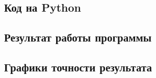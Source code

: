 \documentclass[a4paper,12pt]{article}
\newenvironment{longlisting}{\captionsetup{type=listing}}{}
\begin{document}
\subsection{Код на Python}

\begin{longlisting}
\end{longlisting}

\subsection{Результат работы программы}
\begin{longlisting}

\end{longlisting}

\subsection{Графики точности результата}
\end{document}
